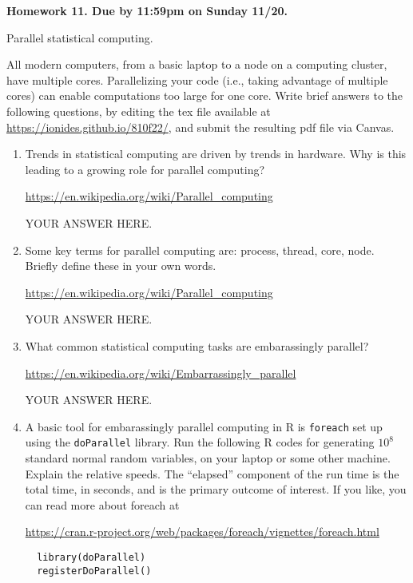 \documentclass[12pt]{article}
\begin{document}
\begin{center}\bf
Homework 11. Due by 11:59pm on Sunday 11/20.

Parallel statistical computing.

\end{center}

All modern computers, from a basic laptop to a node on a computing cluster, have multiple cores. Parallelizing your code (i.e., taking advantage of multiple cores) can enable computations too large for one core. Write brief answers to the following questions, by editing the tex file available at \url{https://ionides.github.io/810f22/}, and submit the resulting pdf file via Canvas. 

\begin{enumerate}

\item Trends in statistical computing are driven by trends in hardware. Why is this leading to a growing role for parallel computing?

\url{https://en.wikipedia.org/wiki/Parallel_computing}

YOUR ANSWER HERE.

\item Some key terms for parallel computing are: process, thread, core, node. Briefly define these in your own words.

\url{https://en.wikipedia.org/wiki/Parallel_computing}

YOUR ANSWER HERE.
  
\item What common statistical computing tasks are embarassingly parallel?

\url{https://en.wikipedia.org/wiki/Embarrassingly_parallel}

YOUR ANSWER HERE.

\item A basic tool for embarassingly parallel computing in R is \texttt{foreach} set up using the \texttt{doParallel} library. Run the following R codes for generating $10^8$ standard normal random variables, on your laptop or some other machine. Explain the relative speeds. The ``elapsed'' component of the run time is the total time, in seconds, and is the primary outcome of interest. If you like, you can read more about foreach at
  
\url{https://cran.r-project.org/web/packages/foreach/vignettes/foreach.html}

\begin{verbatim} 
  library(doParallel)
  registerDoParallel()


\end{verbatim}
\end{enumerate}
\end{document}
